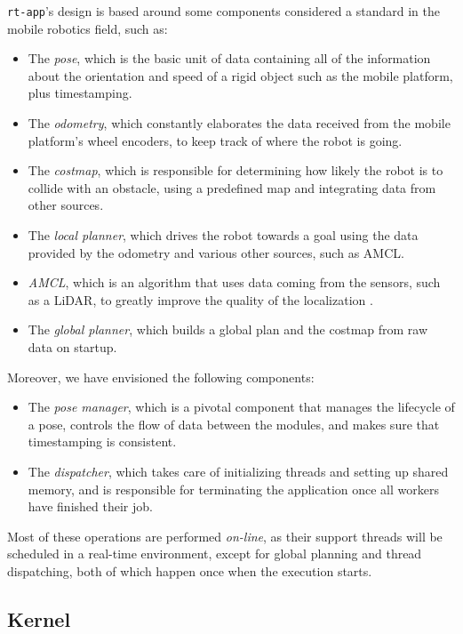 \documentclass[a4paper,12pt]{report}
\begin{document}
\texttt{rt-app}'s design is based around some components considered a standard in the mobile robotics field, such as:
\begin{itemize}
    \item The \textit{pose}, which is the basic unit of data containing all of the information about the orientation and speed of a rigid object such as the mobile platform, plus timestamping.
    \item The \textit{odometry}, which constantly elaborates the data received from the mobile platform's wheel encoders, to keep track of where the robot is going.
    \item The \textit{costmap}, which is responsible for determining how likely the robot is to collide with an obstacle, using a predefined map and integrating data from other sources.
    \item The \textit{local planner}, which drives the robot towards a goal using the data provided by the odometry and various other sources, such as AMCL.
    \item \textit{AMCL}, which is an algorithm that uses data coming from the sensors, such as a LiDAR, to greatly improve the quality of the localization \cite{roswiki-amcl}.
    \item The \textit{global planner}, which builds a global plan and the costmap from raw data on startup.
\end{itemize}

Moreover, we have envisioned the following components:
\begin{itemize}
  \item The \textit{pose manager}, which is a pivotal component that manages the lifecycle of a pose, controls the flow of data between the modules, and makes sure that timestamping is consistent.
  \item The \textit{dispatcher}, which takes care of initializing threads and setting up shared memory, and is responsible for terminating the application once all workers have finished their job.
\end{itemize}

Most of these operations are performed \textit{on-line}, as their support threads will be scheduled in a real-time environment, except for global planning and thread dispatching, both of which happen once when the execution starts.

\subsection{Kernel}
\end{document}
